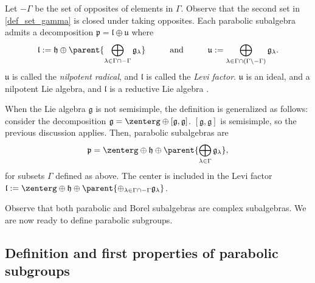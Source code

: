 Let \(-\Gamma\) be the set of opposites of elements in \(\Gamma\). Observe that the second set in \eqref{def_set_gamma} is closed under taking opposites. Each parabolic subalgebra admits a decomposition \(\mathfrak{p}=\mathfrak{l} \oplus \mathfrak{u}\) where
\begin{equation} \label{eq_def_levi_factor}
\mathfrak{l}:= \mathfrak{h} \oplus \parent{\bigoplus_{\lambda \in \Gamma \cap -\Gamma} \mathfrak{g}_\lambda} \hspace{1 cm} \text{and} \hspace{1 cm} \mathfrak{u}:= \bigoplus_{\lambda \in \Gamma \cap (\Gamma \setminus - \Gamma)} \mathfrak{g}_\lambda.
\end{equation}
\(\mathfrak{u}\) is called the \textit{nilpotent radical}, and \(\mathfrak{l}\) is called the \textit{Levi factor}. \(\mathfrak{u}\) is an ideal, and a nilpotent Lie algebra, and \(\mathfrak{l}\) is a reductive Lie algebra \parencite[Cor. 5.94]{knapp2013lie}.

\begin{obs}
    When the Lie algebra \(\mathfrak{g}\) is not semisimple, the definition is generalized as follows: consider the decomposition \(\mathfrak{g}=\zenterg\oplus [\mathfrak{g}, \mathfrak{g}]\). \([\mathfrak{g}, \mathfrak{g}]\) is semisimple, so the previous discussion applies. Then, parabolic subalgebras are
    \[
    \mathfrak{p}=\zenterg \oplus \mathfrak{h} \oplus \parent{\bigoplus_{\lambda \in \Gamma} \mathfrak{g}_\lambda},
    \]
    for subsets \(\Gamma\) defined as above. The center is included in the Levi factor \(\mathfrak{l}:=\zenterg \oplus \mathfrak{h} \oplus \parent{\oplus_{\lambda \in \Gamma \cap -\Gamma} \mathfrak{g}_\lambda}\).
\end{obs}

Observe that both parabolic and Borel subalgebras are complex subalgebras. We are now ready to define parabolic subgroups.

\subsection{Definition and first properties of parabolic subgroups} 


